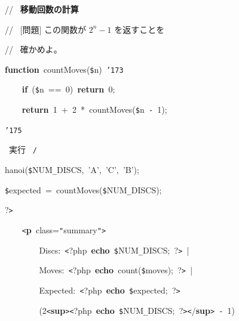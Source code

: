 \documentclass[a4paper,10pt]{article}
\def\mc{\relax}
\begin{document}
\noindent
\mbox{}\rm\mc // \ {\bf 移動回数の計算} \hfill
\tt\mc 

\noindent
\mbox{}\rm\mc // \ [問題] この関数が $2^n - 1$ を返すことを
\tt\mc 

\noindent
\mbox{}\rm\mc // \    確かめよ。 \hfill
\tt\mc 

\noindent
\mbox{}\textbf{function}{\tt\mc \ }countMoves({\tt\$}n){\tt\mc \ }{\tt\char'173}

\noindent
\mbox{}{\tt\mc \ }{\tt\mc \ }{\tt\mc \ }{\tt\mc \ }\textbf{if}{\tt\mc \ }({\tt\$}n{\tt\mc \ }=={\tt\mc \ }0){\tt\mc \ }\textbf{return}{\tt\mc \ }0;

\noindent
\mbox{}{\tt\mc \ }{\tt\mc \ }{\tt\mc \ }{\tt\mc \ }\textbf{return}{\tt\mc \ }1{\tt\mc \ }+{\tt\mc \ }2{\tt\mc \ }*{\tt\mc \ }countMoves({\tt\$}n{\tt\mc \ }{\tt -}{\tt\mc \ }1);

\noindent
\mbox{}{\tt\char'175}

\noindent
\mbox{}\hfill

\noindent
\mbox{}\rm\mc {\tt /}{\tt *}\  実行 \rm\mc \ {\tt *}{\tt /}
\tt\mc 

\noindent
\mbox{}hanoi({\tt\$}NUM{\tt\_}DISCS,{\tt\mc \ }'A',{\tt\mc \ }'C',{\tt\mc \ }'B');

\noindent
\mbox{}{\tt\$}expected{\tt\mc \ }={\tt\mc \ }countMoves({\tt\$}NUM{\tt\_}DISCS);

\noindent
\mbox{}?{\tt >}

\noindent
\mbox{}\hfill

\noindent
\mbox{}{\tt\mc \ }{\tt\mc \ }{\tt\mc \ }{\tt\mc \ }{\tt <}\textbf{p}{\tt\mc \ }class={\tt "}summary{\tt "}{\tt >}

\noindent
\mbox{}{\tt\mc \ }{\tt\mc \ }{\tt\mc \ }{\tt\mc \ }{\tt\mc \ }{\tt\mc \ }{\tt\mc \ }{\tt\mc \ }Discs:{\tt\mc \ }{\tt <}?php{\tt\mc \ }\textbf{echo}{\tt\mc \ }{\tt\$}NUM{\tt\_}DISCS;{\tt\mc \ }?{\tt >}{\tt\mc \ }|

\noindent
\mbox{}{\tt\mc \ }{\tt\mc \ }{\tt\mc \ }{\tt\mc \ }{\tt\mc \ }{\tt\mc \ }{\tt\mc \ }{\tt\mc \ }Moves:{\tt\mc \ }{\tt <}?php{\tt\mc \ }\textbf{echo}{\tt\mc \ }count({\tt\$}moves);{\tt\mc \ }?{\tt >}{\tt\mc \ }|

\noindent
\mbox{}{\tt\mc \ }{\tt\mc \ }{\tt\mc \ }{\tt\mc \ }{\tt\mc \ }{\tt\mc \ }{\tt\mc \ }{\tt\mc \ }Expected:{\tt\mc \ }{\tt <}?php{\tt\mc \ }\textbf{echo}{\tt\mc \ }{\tt\$}expected;{\tt\mc \ }?{\tt >}

\noindent
\mbox{}{\tt\mc \ }{\tt\mc \ }{\tt\mc \ }{\tt\mc \ }{\tt\mc \ }{\tt\mc \ }{\tt\mc \ }{\tt\mc \ }(2{\tt <}\textbf{sup}{\tt >}{\tt <}?php{\tt\mc \ }\textbf{echo}{\tt\mc \ }{\tt\$}NUM{\tt\_}DISCS;{\tt\mc \ }?{\tt >}{\tt <}/\textbf{sup}{\tt >}{\tt\mc \ }{\tt -}{\tt\mc \ }1)
\end{document}

